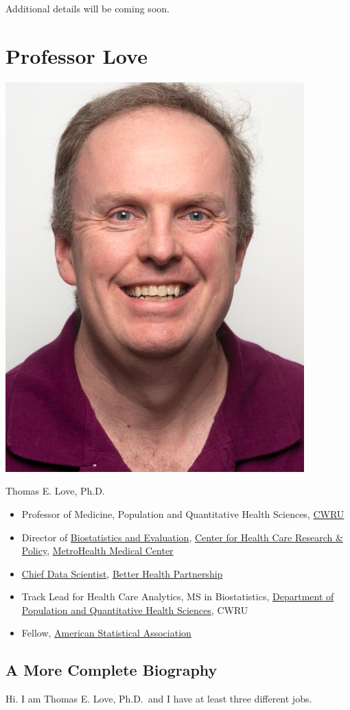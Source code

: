 \documentclass[
]{book}
\providecommand{\tightlist}{%
  \setlength{\itemsep}{0pt}\setlength{\parskip}{0pt}}
\begin{document}
Additional details will be coming soon.

\hypertarget{professor-love}{%
\chapter{Professor Love}\label{professor-love}}

\includegraphics[width=0.3\linewidth]{figures/Love2019}

Thomas E. Love, Ph.D.

\begin{itemize}
\tightlist
\item
  Professor of Medicine, Population and Quantitative Health Sciences, \href{http://case.edu/}{CWRU}
\item
  Director of \href{http://chrp.org/biostatistics-evaluation/}{Biostatistics and Evaluation}, \href{http://chrp.org/}{Center for Health Care Research \& Policy}, \href{https://www.metrohealth.org/research}{MetroHealth Medical Center}
\item
  \href{http://www.betterhealthpartnership.org/data_center/}{Chief Data Scientist}, \href{http://betterhealthpartnership.org/}{Better Health Partnership}
\item
  Track Lead for Health Care Analytics, MS in Biostatistics, \href{http://epbiwww.case.edu/}{Department of Population and Quantitative Health Sciences}, CWRU
\item
  Fellow, \href{http://www.amstat.org/}{American Statistical Association}
\end{itemize}

\hypertarget{a-more-complete-biography}{%
\section{A More Complete Biography}\label{a-more-complete-biography}}

Hi. I am Thomas E. Love, Ph.D.~and I have at least three different jobs.
\end{document}
